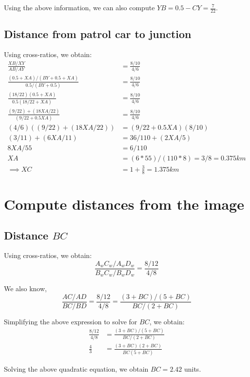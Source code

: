 \documentclass[12pt, oneside]{article}
\begin{document}
Using the above information, we can also compute $YB = 0.5 - CY = \frac{7}{22}$.

\subsection{Distance from patrol car to junction}

Using cross-ratios, we obtain:
\begin{align*}
    \frac{XB/XY}{AB/AY}  &= \frac{8/10}{4/6} \\ 
    \frac{(0.5 + XA)/(BY + 0.5 + XA)}{0.5/(BY + 0.5)}  &= \frac{8/10}{4/6}  \\ 
    \frac{(18/22)(0.5 + XA)}{0.5(18/22 + XA)}  &= \frac{8/10}{4/6}  \\
    \frac{(9/22) + (18XA/22)}{(9/22 + 0.5XA)}  &= \frac{8/10}{4/6}  \\
    (4/6)((9/22) + (18XA/22))  &= (9/22 + 0.5XA)(8/10)  \\
    (3/11) + (6XA/11)  &= 36/110 + (2XA/5)  \\
    8XA/55  &= 6/110   \\
    XA  &= (6 * 55) / (110 * 8) = 3/8 = 0.375 km \\
    \implies XC &= 1 + \frac{3}{8} = 1.375 km 
\end{align*}

\clearpage
\section{Compute distances from the image}

\subsection{Distance $BC$}

Using cross-ratios, we obtain:
$$\frac{A_wC_w/A_wD_w}{B_wC_w/B_wD_w}  = \frac{8/12}{4/8} $$

We also know, 
$$\frac{AC/AD}{BC/BD}  = \frac{8/12}{4/8} = 
\frac{(3 + BC)/(5 + BC)}{BC/(2 + BC)}$$

Simplifying the above expression to solve for $BC$, we obtain:
\begin{align*}
    \frac{8/12}{4/8} &=  \frac{(3 + BC)/(5 + BC)}{BC/(2 + BC)} \\
    \frac{4}{3} &=  \frac{(3 + BC)(2 + BC)}{BC(5 + BC)} 
\end{align*}

Solving the above quadratic equation, we obtain $BC = 2.42$ units.
\end{document}
